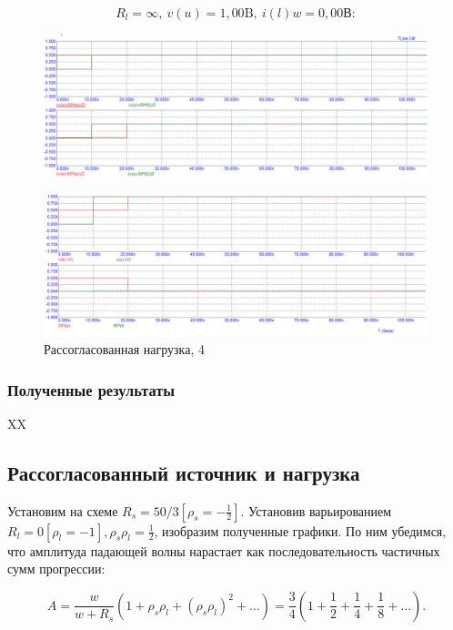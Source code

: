 \documentclass[a4paper, 14pt]{extarticle}%
\begin{document}
\[R_l =\infty,\  v(u)=1,00 \text{B},\ i(l)w =0,00 \text{В} :\]

\begin{figure}[h!]
			\centering
			\includegraphics[width=1.1\linewidth]{./graphs/12.jpg}
			\label{3.4.1}
\end{figure}

\newpage

\begin{figure}[h!]
			\centering
			\includegraphics[width=1.1\linewidth]{./graphs/13.jpg}
			\caption{Рассогласованная нагрузка, 4}
			\label{3.4.2}
\end{figure}

\subsubsection{Полученные результаты}

XX

\subsection{Рассогласованный источник и нагрузка}

Установим на схеме $R_{s}=50 / 3\left[\rho_{s}=-\frac{1}{2}\right] .$ Установив варьированием $R_{l}=0\left[\rho_{l}=-1\right], \rho_{s} \rho_{l}=\frac{1}{2}$, изобразим полученные графики. По ним убедимся, что амплитуда падающей волны нарастает как последовательность частичных сумм прогрессии:


\[
A=\frac{w}{w+R_{s}}\left(1+\rho_{s} \rho_{l}+\left(\rho_{s} \rho_{l}\right)^{2}+\ldots\right)=\frac{3}{4}\left(1+\frac{1}{2}+\frac{1}{4}+\frac{1}{8}+\ldots\right) .
\]
\end{document}
